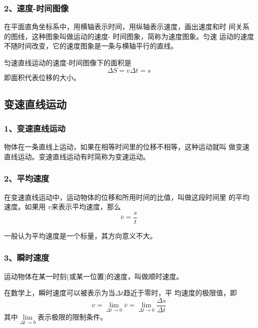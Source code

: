 \subsubsection*{2、速度-时间图像}
在平面直角坐标系中，用横轴表示时间，用纵轴表示速度，画出速度和时
间关系的图线，这种图象叫做运动的速度- 时间图象，简称为速度图象。匀速
运动的速度不随时间改变，它的速度图象是一条与横轴平行的直线。

匀速直线运动的速度-时间图像下的面积是
\begin{equation}
    \Delta S=v\Delta t=s
\end{equation}
即面积代表位移的大小。
\subsection{变速直线运动}
\subsubsection*{1、变速直线运动}
\begin{definition}
    物体在一条直线上运动，如果在相等时间里的位移不相等，这种运动就叫
    做变速直线运动。变速直线运动有时简称为变速运动。
\end{definition}

\subsubsection*{2、平均速度}
\begin{definition}
    在变速直线运动中，运动物体的位移和所用时间的比值，叫做这段时间里
的平均速度。如果用 $v$来表示平均速度，那么
\begin{equation}
    \overline{v}=\frac{s}{t}
\end{equation}
\end{definition}

一般认为平均速度是一个标量，其方向意义不大。
\subsubsection*{3、瞬时速度}
\begin{definition}
    运动物体在某一时刻(或某一位置)的速度，叫做顺时速度。
\end{definition}

在数学上，瞬时速度可以被表示为当$\Delta t$趋近于零时，平
均速度的极限值，即 
\begin{equation}
    v=\lim\limits_{\Delta t\to 0}\overline{v}=\lim\limits_{\Delta t\to 0}
    \frac{\Delta s}{\Delta t}
\end{equation}
其中$\lim\limits_{\Delta t\to 0}$表示极限的限制条件。

